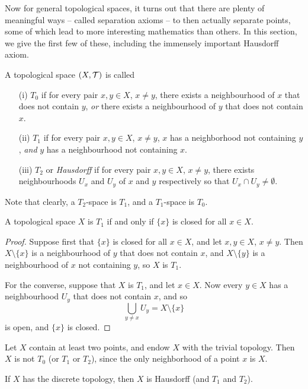 Now for general topological spaces, it turns out that there are plenty of meaningful ways -- called separation axioms -- to then actually separate points, some of which lead to more interesting mathematics than others. In this section, we give the first few of these, including the immensely important Hausdorff axiom.
\begin{defn}
  A topological space $(X,\mathcal{T})$ is called
  \begin{enumerate}
    \item[(i)] $T_0$ if for every pair $x, y \in X$, $x \not= y$, there exists a neighbourhood of $x$ that does not contain $y$, \emph{or} there exists a neighbourhood of $y$ that does not contain $x$.
    \item[(ii)] $T_1$ if for every pair $x,y \in X$, $x \not= y$, $x$ has a neighborhood not containing $y$, \emph{and} $y$ has a neighbourhood not containing $x$.
    \item[(iii)] $T_2$ or \emph{Hausdorff} if for every pair $x, y \in X$, $x \not= y$, there exists neighbourhoods $U_x$ and $U_y$ of $x$ and $y$ respectively so that $U_x \cap U_y \not= \emptyset$.
  \end{enumerate}
\end{defn}
Note that clearly, a $T_2$-space is $T_1$, and a $T_1$-space is $T_0$.
\begin{prop}
  A topological space $X$ is $T_1$ if and only if $\{x \}$ is closed for all $x \in X$.
\end{prop}
\begin{proof}
  Suppose first that $\{x\}$ is closed for all $x \in X$, and let $x,y \in X$, $x \not= y$. Then $X \setminus \{x\}$ is a neighbourhood of $y$ that does not contain $x$, and $X \setminus \{y \}$ is a neighbourhood of $x$ not containing $y$, so $X$ is $T_1$.
  
  For the converse, suppose that $X$ is $T_1$, and let $x \in X$. Now every $y \in X$ has a neighbourhood $U_y$ that does not contain $x$, and so
  \[
    \bigcup_{y \not= x} U_y = X \setminus \{ x\}
  \]
  is open, and $\{x\}$ is closed.
\end{proof}
\begin{example}
  Let $X$ contain at least two points, and endow $X$ with the trivial topology. Then $X$ is not $T_0$ (or $T_1$ or $T_2$), since the only neighborhood of a point $x$ is $X$.
\end{example}
\begin{example}
  If $X$ has the discrete topology, then $X$ is Hausdorff (and $T_1$ and $T_2$).
\end{example}
